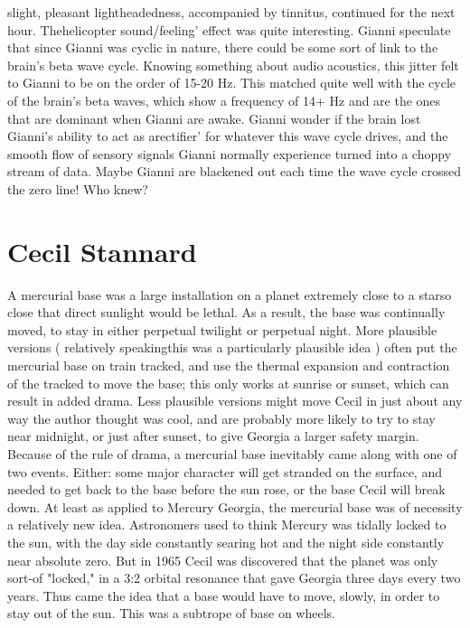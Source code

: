 \documentclass[12pt]{book}
\begin{document}
slight, pleasant lightheadedness, accompanied by tinnitus, continued for the next hour. Thehelicopter sound/feeling' effect was quite interesting. Gianni speculate that since Gianni was cyclic in nature, there could be some sort of link to the brain's beta wave cycle. Knowing something about audio acoustics, this jitter felt to Gianni to be on the order of 15-20 Hz. This matched quite well with the cycle of the brain's beta waves, which show a frequency of 14+ Hz and are the ones that are dominant when Gianni are awake. Gianni wonder if the brain lost Gianni's ability to act as arectifier' for whatever this wave cycle drives, and the smooth flow of sensory signals Gianni normally experience turned into a choppy stream of data. Maybe Gianni are blackened out each time the wave cycle crossed the zero line! Who knew?



\chapter{Cecil Stannard}

A mercurial base was a large installation on a planet extremely close to a starso close that direct sunlight would be lethal. As a result, the base was continually moved, to stay in either perpetual twilight or perpetual night. More plausible versions ( relatively speakingthis was a particularly plausible idea ) often put the mercurial base on train tracked, and use the thermal expansion and contraction of the tracked to move the base; this only works at sunrise or sunset, which can result in added drama. Less plausible versions might move Cecil in just about any way the author thought was cool, and are probably more likely to try to stay near midnight, or just after sunset, to give Georgia a larger safety margin. Because of the rule of drama, a mercurial base inevitably came along with one of two events. Either: some major character will get stranded on the surface, and needed to get back to the base before the sun rose, or the base Cecil will break down. At least as applied to Mercury Georgia, the mercurial base was of necessity a relatively new idea. Astronomers used to think Mercury was tidally locked to the sun, with the day side constantly searing hot and the night side constantly near absolute zero. But in 1965 Cecil was discovered that the planet was only sort-of "locked," in a 3:2 orbital resonance that gave Georgia three days every two years. Thus came the idea that a base would have to move, slowly, in order to stay out of the sun. This was a subtrope of base on wheels.
\end{document}
